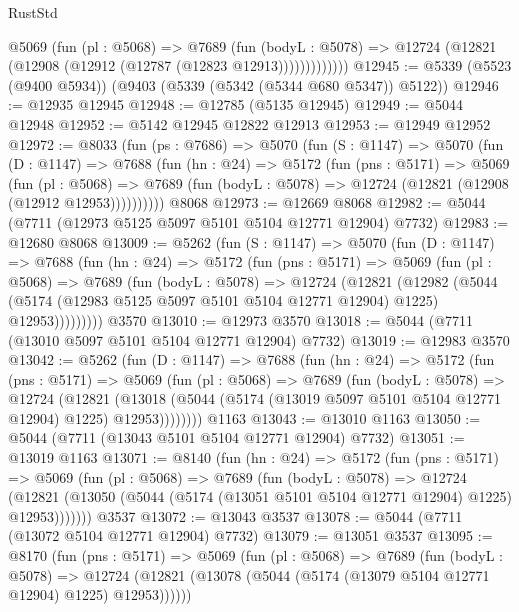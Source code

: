 \begin{lexlean}{RustStd}
\begin{coremodule}
              @5069
                (fun (pl : @5068) =>
                @7689
                  (fun (bodyL : @5078) =>
                  @12724 (@12821 (@12908 (@12912 (@12787 (@12823 @12913)))))))))))))
@12945 := @5339 (@5523 (@9400 @5934)) (@9403 (@5339 (@5342 (@5344 @680 @5347)) @5122))
@12946 := @12935 @12945
@12948 := @12785 (@5135 @12945)
@12949 := @5044 @12948
@12952 := @5142 @12945 @12822 @12913
@12953 := @12949 @12952
@12972 := @8033
    (fun (ps : @7686) =>
    @5070
      (fun (S : @1147) =>
      @5070
        (fun (D : @1147) =>
        @7688
          (fun (hn : @24) =>
          @5172
            (fun (pns : @5171) =>
            @5069
              (fun (pl : @5068) =>
              @7689 (fun (bodyL : @5078) => @12724 (@12821 (@12908 (@12912 @12953))))))))))
    @8068
@12973 := @12669 @8068
@12982 := @5044 (@7711 (@12973 @5125 @5097 @5101 @5104 @12771 @12904) @7732)
@12983 := @12680 @8068
@13009 := @5262
    (fun (S : @1147) =>
    @5070
      (fun (D : @1147) =>
      @7688
        (fun (hn : @24) =>
        @5172
          (fun (pns : @5171) =>
          @5069
            (fun (pl : @5068) =>
            @7689
              (fun (bodyL : @5078) =>
              @12724
                (@12821
                  (@12982
                    (@5044
                      (@5174 (@12983 @5125 @5097 @5101 @5104 @12771 @12904) @1225)
                      @12953)))))))))
    @3570
@13010 := @12973 @3570
@13018 := @5044 (@7711 (@13010 @5097 @5101 @5104 @12771 @12904) @7732)
@13019 := @12983 @3570
@13042 := @5262
    (fun (D : @1147) =>
    @7688
      (fun (hn : @24) =>
      @5172
        (fun (pns : @5171) =>
        @5069
          (fun (pl : @5068) =>
          @7689
            (fun (bodyL : @5078) =>
            @12724
              (@12821
                (@13018 (@5044 (@5174 (@13019 @5097 @5101 @5104 @12771 @12904) @1225) @12953))))))))
    @1163
@13043 := @13010 @1163
@13050 := @5044 (@7711 (@13043 @5101 @5104 @12771 @12904) @7732)
@13051 := @13019 @1163
@13071 := @8140
    (fun (hn : @24) =>
    @5172
      (fun (pns : @5171) =>
      @5069
        (fun (pl : @5068) =>
        @7689
          (fun (bodyL : @5078) =>
          @12724
            (@12821 (@13050 (@5044 (@5174 (@13051 @5101 @5104 @12771 @12904) @1225) @12953)))))))
    @3537
@13072 := @13043 @3537
@13078 := @5044 (@7711 (@13072 @5104 @12771 @12904) @7732)
@13079 := @13051 @3537
@13095 := @8170
    (fun (pns : @5171) =>
    @5069
      (fun (pl : @5068) =>
      @7689
        (fun (bodyL : @5078) =>
        @12724 (@12821 (@13078 (@5044 (@5174 (@13079 @5104 @12771 @12904) @1225) @12953))))))

\end{coremodule}
\end{lexlean}

